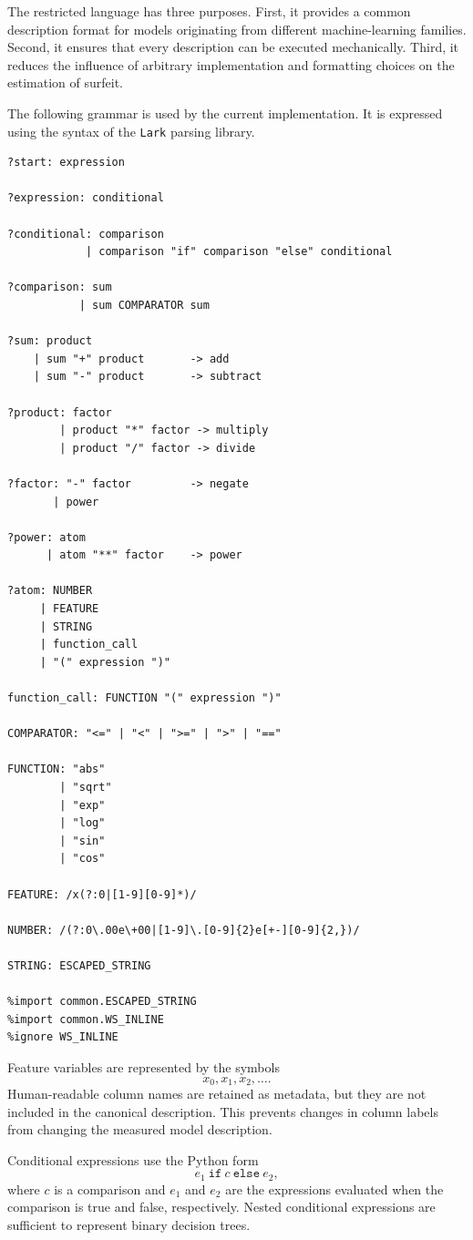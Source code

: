 The restricted language has three purposes. First, it provides a common
description format for models originating from different machine-learning
families. Second, it ensures that every description can be executed
mechanically. Third, it reduces the influence of arbitrary implementation and
formatting choices on the estimation of surfeit.

The following grammar is used by the current implementation. It is expressed
using the syntax of the \texttt{Lark} parsing library.

\begin{verbatim}
?start: expression

?expression: conditional

?conditional: comparison
            | comparison "if" comparison "else" conditional

?comparison: sum
           | sum COMPARATOR sum

?sum: product
    | sum "+" product       -> add
    | sum "-" product       -> subtract

?product: factor
        | product "*" factor -> multiply
        | product "/" factor -> divide

?factor: "-" factor         -> negate
       | power

?power: atom
      | atom "**" factor    -> power

?atom: NUMBER
     | FEATURE
     | STRING
     | function_call
     | "(" expression ")"

function_call: FUNCTION "(" expression ")"

COMPARATOR: "<=" | "<" | ">=" | ">" | "=="

FUNCTION: "abs"
        | "sqrt"
        | "exp"
        | "log"
        | "sin"
        | "cos"

FEATURE: /x(?:0|[1-9][0-9]*)/

NUMBER: /(?:0\.00e\+00|[1-9]\.[0-9]{2}e[+-][0-9]{2,})/

STRING: ESCAPED_STRING

%import common.ESCAPED_STRING
%import common.WS_INLINE
%ignore WS_INLINE
\end{verbatim}

Feature variables are represented by the symbols
\[
x_0,x_1,x_2,\ldots.
\]
Human-readable column names are retained as metadata, but they are not included
in the canonical description. This prevents changes in column labels from
changing the measured model description.

Conditional expressions use the Python form
\[
e_1\ \texttt{if}\ c\ \texttt{else}\ e_2,
\]
where \(c\) is a comparison and \(e_1\) and \(e_2\) are the expressions
evaluated when the comparison is true and false, respectively. Nested
conditional expressions are sufficient to represent binary decision trees.

